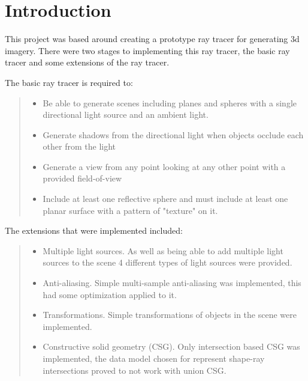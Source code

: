 \chapter{Introduction}
  This project was based around creating a prototype ray tracer for generating
  3d imagery.  There were two stages to implementing this ray tracer, the basic
  ray tracer and some extensions of the ray tracer.
  
  \vspace{10pt}

  The basic ray tracer is required to:
  \begin{quote}\begin{itemize}
    \item Be able to generate scenes including planes and spheres with a
      single directional light source and an ambient light.
    \item Generate shadows from the directional light when objects occlude each
      other from the light
    \item Generate a view from any point looking at any other point with a
      provided field-of-view
    \item Include at least one reflective sphere and must include at least one
      planar surface with a pattern of "texture" on it.
  \end{itemize}\end{quote}

  \vspace{10pt}

  The extensions that were implemented included:
  \begin{quote}\begin{itemize}
    \item Multiple light sources.  As well as being able to add multiple light
      sources to the scene 4 different types of light sources were provided.
    \item Anti-aliasing. Simple multi-sample anti-aliasing was implemented, this
      had some optimization applied to it.
    \item Transformations. Simple transformations of objects in the scene were
      implemented.
    \item Constructive solid geometry (CSG). Only intersection based CSG was
      implemented, the data model chosen for represent shape-ray intersections
      proved to not work with union CSG.
  \end{itemize}\end{quote}
  
    

